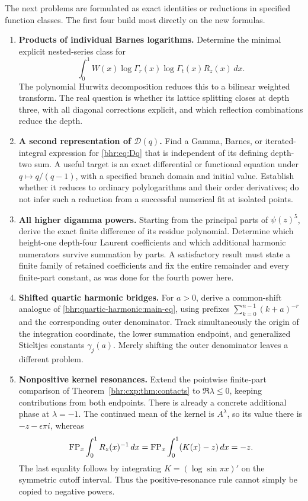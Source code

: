 The next problems are formulated as exact identities or reductions
in specified function classes. The first four build most directly
on the new formulas.

\begin{enumerate}[label=\textbf{F\arabic*.},leftmargin=*,itemsep=9pt]
 \item \textbf{Products of individual Barnes logarithms.}
 Determine the minimal explicit nested-series class for
 \[
  \int_0^1 W(x)\log\Gamma_r(x)\log\Gamma_t(x)R_z(x)\,dx.
 \]
 The polynomial Hurwitz decomposition reduces this to a bilinear
 weighted transform. The real question is whether its lattice
 splitting closes at depth three, with all diagonal corrections
 explicit, and which reflection combinations reduce the depth.

 \item \textbf{A second representation of $\mathcal D(q)$.}
 Find a Gamma, Barnes, or iterated-integral expression for
 \eqref{bhr:eq:Dq} that is independent of its defining depth-two sum.
 A useful target is an exact differential or functional equation
 under $q\mapsto q/(q-1)$, with a specified branch domain and
 initial value. Establish whether it reduces to ordinary
 polylogarithms and their order derivatives; do not infer such a
 reduction from a successful numerical fit at isolated points.

 \item \textbf{All higher digamma powers.}
 Starting from the principal parts of $\psi(z)^5$, derive the
 exact finite difference of its residue polynomial. Determine
 which height-one depth-four Laurent coefficients and which
 additional harmonic numerators survive summation by parts.
 A satisfactory result must state a finite family of retained
 coefficients and fix the entire remainder and every finite-part
 constant, as was done for the fourth power here.

 \item \textbf{Shifted quartic harmonic bridges.}
 For $a>0$, derive a common-shift analogue of
 \eqref{bhr:quartic-harmonic:main-eq}, using prefixes
 $\sum_{k=0}^{n-1}(k+a)^{-r}$ and the corresponding outer
 denominator. Track simultaneously the origin of the integration
 coordinate, the lower summation endpoint, and generalized
 Stieltjes constants $\gamma_j(a)$. Merely shifting the outer
 denominator leaves a different problem.

 \item \textbf{Nonpositive kernel resonances.}
 Extend the pointwise finite-part comparison of
 Theorem~\ref{bhr:cxp:thm:contacts} to $\Re\lambda\le0$,
 keeping contributions from both endpoints. There is already a
 concrete additional phase at $\lambda=-1$. The continued mean
 of the kernel is $A^\lambda$, so its value there is
 $-z-\epsilon\pi i$, whereas
 \[
  \operatorname{FP}_x\int_0^1 R_z(x)^{-1}\,dx
   =\operatorname{FP}_x\int_0^1(K(x)-z)\,dx=-z.
 \]
 The last equality follows by integrating $K=(\log\sin\pi x)'$
 on the symmetric cutoff interval. Thus the positive-resonance
 rule cannot simply be copied to negative powers.


\end{enumerate}
